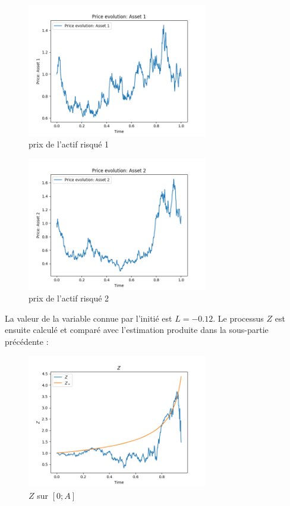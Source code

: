 \documentclass[../finalreport.tex]{subfiles}
\begin{document}
\begin{figure}[H]
  \centering
    \includegraphics[width=0.7\textwidth]{images/simulation_1/price_1.png}
  \caption{prix de l'actif risqué 1}
\end{figure}

\begin{figure}[H]
  \centering
    \includegraphics[width=0.7\textwidth]{images/simulation_1/price_2.png}
  \caption{prix de l'actif risqué 2}
\end{figure}

\par La valeur de la variable connue par l'initié est $L = -0.12$. Le processus $Z$ est ensuite calculé et comparé avec l'estimation produite dans la sous-partie précédente :

\begin{figure}[H]
  \centering
    \includegraphics[width=0.7\textwidth]{images/simulation_1/compared_Z.png}
  \caption{$Z$ sur $\left[0; A \right]$}
\end{figure}
\end{document}
